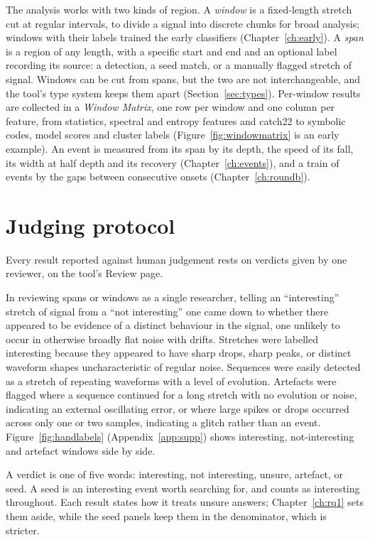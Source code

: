 The analysis works with two kinds of region. A \emph{window} is a fixed-length stretch cut at regular intervals, to divide a signal into discrete chunks for broad analysis; windows with their labels trained the early classifiers (Chapter~\ref{ch:early}). A \emph{span} is a region of any length, with a specific start and end and an optional label recording its source: a detection, a seed match, or a manually flagged stretch of signal. Windows can be cut from spans, but the two are not interchangeable, and the tool's type system keeps them apart (Section~\ref{sec:types}). Per-window results are collected in a \emph{Window Matrix}, one row per window and one column per feature, from statistics, spectral and entropy features and catch22 to symbolic codes, model scores and cluster labels (Figure~\ref{fig:windowmatrix} is an early example). An event is measured from its span by its depth, the speed of its fall, its width at half depth and its recovery (Chapter~\ref{ch:events}), and a train of events by the gaps between consecutive onsets (Chapter~\ref{ch:roundb}).

\section{Judging protocol}
\label{sec:judging}

Every result reported against human judgement rests on verdicts given by one reviewer, on the tool's Review page.

In reviewing spans or windows as a single researcher, telling an ``interesting'' stretch of signal from a ``not interesting'' one came down to whether there appeared to be evidence of a distinct behaviour in the signal, one unlikely to occur in otherwise broadly flat noise with drifts. Stretches were labelled interesting because they appeared to have sharp drops, sharp peaks, or distinct waveform shapes uncharacteristic of regular noise. Sequences were easily detected as a stretch of repeating waveforms with a level of evolution. Artefacts were flagged where a sequence continued for a long stretch with no evolution or noise, indicating an external oscillating error, or where large spikes or drops occurred across only one or two samples, indicating a glitch rather than an event. Figure~\ref{fig:handlabels} (Appendix~\ref{app:supp}) shows interesting, not-interesting and artefact windows side by side.

A verdict is one of five words: interesting, not interesting, unsure, artefact, or seed. A seed is an interesting event worth searching for, and counts as interesting throughout. Each result states how it treats unsure answers; Chapter~\ref{ch:rq1} sets them aside, while the seed panels keep them in the denominator, which is stricter.

